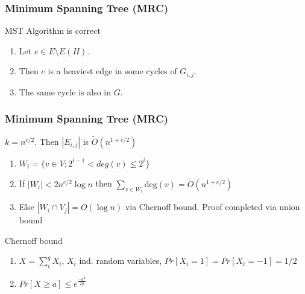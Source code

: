 \documentclass[12pt,aspectratio=169]{beamer}
\begin{document}
\begin{frame}\frametitle{Minimum Spanning Tree (MRC)}
  \begin{block}{MST Algorithm is correct}
    \begin{enumerate}
      \item
    Let $e\in E\setminus E(H)$.
      \item
    Then $e$ is a heaviest edge in some cycles of $G_{i,j}$.
      \item
    The same cycle is also in $G$.
  \end{enumerate}
\end{block}
\end{frame}



\begin{frame}\frametitle{Minimum Spanning Tree (MRC)}
  \begin{block}{$k = n^{c/2}$.    Then $|E_{i,j}|$ is $\tilde{O}(n^{1+c/2})$}
    \begin{enumerate}
      \item
        $W_{i} = \{v \in V : 2^{i-1} < deg(v) \le 2^{i} \}$
      \item
        If $|W_{i} | < 2n^{c/2}\log n $ then $\sum_{v\in W_{i}}\text{deg}(v) =
        \tilde{O}(n^{1+c/2})$
      \item
        Else $|W_{i} \cap V_{j}| = O(\log n)$ via Chernoff bound.
        Proof completed via union bound
      \end{enumerate}
    \end{block}

    \begin{block}{Chernoff bound}
    \begin{enumerate}
      \item
      $X=\sum_{i}^{q}X_{i}$, $X_{i}$ ind. random variables, $Pr[X_{i}=1]=Pr[X_{i}=-1]=1/2$
    \item
      $Pr[X\ge a] \le e^{\frac{-a^{2}}{2q}}$
    \end{enumerate}
  \end{block}
\end{frame}
\end{document}
